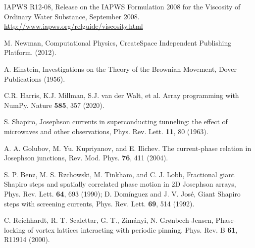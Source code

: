 \documentclass[twocolumn,preprintnumbers,amsmath,amssymb,aps,prb]{revtex4}
\begin{document}
\begin{thebibliography}{99}
    IAPWS R12-08, 
    Release on the IAPWS Formulation 2008 for the Viscosity of Ordinary Water Substance,  September 2008.
    \url{http://www.iapws.org/relguide/viscosity.html}

   M. Newman, Computational Physics, CreateSpace Independent Publishing Platform. (2012).
      
   A. Einstein, Investigations on the Theory of the Brownian Movement,  Dover Publications (1956).

     C.R. Harris, K.J. Millman, S.J. van der Walt, et al. Array programming with NumPy. Nature {\bf 585}, 357 (2020). %
      
     S. Shapiro, Josephson currents in superconducting tunneling: the effect of microwaves and other observations, Phys. Rev. Lett. {\bf 11}, 80 (1963).

     A. A. Golubov, M. Yu. Kupriyanov, and E. Il{\`i}chev. The current-phase relation in Josephson junctions, Rev. Mod. Phys. {\bf 76}, 411 (2004).

      S. P. Benz, M. S. Rzchowski, M. Tinkham, and C. J. Lobb, Fractional giant Shapiro steps and spatially correlated phase motion in 2D Josephson arrays, Phys. Rev. Lett. {\bf 64}, 693 (1990); D. Dom{\'i}nguez and J. V. Jos{\'e}, Giant Shapiro steps with screening currents, Phys. Rev. Lett. {\bf 69}, 514 (1992).

     C. Reichhardt, R. T. Scalettar, G. T., Zim{\'a}nyi, N. Gr{\o}nbech-Jensen,  Phase-locking of vortex lattices interacting with periodic pinning.  Phys. Rev. B {\bf 61}, R11914 (2000).
     

\end{thebibliography}
      
\end{document}
